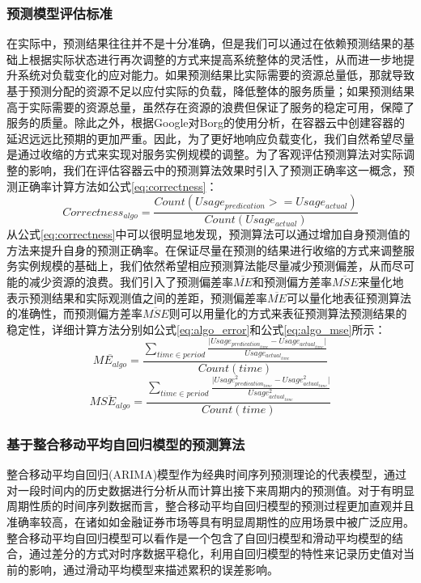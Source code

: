 \subsubsection{预测模型评估标准}
在实际中，预测结果往往并不是十分准确，但是我们可以通过在依赖预测结果的基础上根据实际状态进行再次调整的方式来提高系统整体的灵活性，从而进一步地提升系统对负载变化的应对能力。如果预测结果比实际需要的资源总量低，那就导致基于预测分配的资源不足以应付实际的负载，降低整体的服务质量；如果预测结果高于实际需要的资源总量，虽然存在资源的浪费但保证了服务的稳定可用，保障了服务的质量。除此之外，根据Google对Borg的使用分析，在容器云中创建容器的延迟远远比预期的更加严重\cite{verma2015large}。因此，为了更好地响应负载变化，我们自然希望尽量是通过收缩的方式来实现对服务实例规模的调整。为了客观评估预测算法对实际调整的影响，我们在评估容器云中的预测算法效果时引入了预测正确率这一概念，预测正确率计算方法如公式\ref{eq:correctness}：
\begin{equation}\label{eq:correctness}
Correctness_{algo} = \frac{Count(Usage_{predication} >= Usage_{actual})}{Count(Usage_{actual})}
\end{equation}
从公式\ref{eq:correctness}中可以很明显地发现，预测算法可以通过增加自身预测值的方法来提升自身的预测正确率。在保证尽量在预测的结果进行收缩的方式来调整服务实例规模的基础上，我们依然希望相应预测算法能尽量减少预测偏差，从而尽可能的减少资源的浪费。我们引入了预测偏差率$\overline{ME}$和预测偏方差率$\overline{MSE}$来量化地表示预测结果和实际观测值之间的差距，预测偏差率$\overline{ME}$可以量化地表征预测算法的准确性，而预测偏方差率$\overline{MSE}$则可以用量化的方式来表征预测算法预测结果的稳定性，详细计算方法分别如公式\ref{eq:algo_error}和公式\ref{eq:algo_mse}所示：
\begin{equation}\label{eq:algo_error}
\overline{ME_{algo}} = \frac{\sum_{time \in period} {\frac{\vert Usage_{predication_{time}} - Usage_{actual_{time}}\vert}{Usage_{actual_{time}}}}}{Count(time)}
\end{equation}
\begin{equation}\label{eq:algo_mse}
\overline{MSE_{algo}} = \frac{\sum_{time \in period} {\frac{\vert Usage_{predication_{time}}^{2} - Usage_{actual_{time}}^{2}\vert}{Usage_{actual_{time}}^{2}}}}{Count(time)}
\end{equation}

\subsubsection{基于整合移动平均自回归模型的预测算法}
整合移动平均自回归(ARIMA)模型作为经典时间序列预测理论的代表模型，通过对一段时间内的历史数据进行分析从而计算出接下来周期内的预测值。对于有明显周期性质的时间序列数据而言，整合移动平均自回归模型的预测过程更加直观并且准确率较高，在诸如如金融证券市场等具有明显周期性的应用场景中被广泛应用。整合移动平均自回归模型可以看作是一个包含了自回归模型和滑动平均模型的结合，通过差分的方式对时序数据平稳化，利用自回归模型的特性来记录历史值对当前的影响，通过滑动平均模型来描述累积的误差影响。


